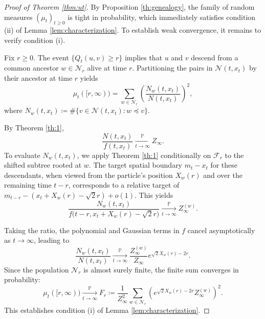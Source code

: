 \documentclass{article}
\begin{document}
\begin{proof}[Proof of Theorem \ref{thm:ut}]
    By Proposition \ref{th:genealogy}, the family of random measures $(\mu_t)_{t \geq 0}$ is tight in probability, which immediately satisfies condition (ii) of Lemma \ref{lem:characterization}. To establish weak convergence, it remains to verify condition (i).

    Fix $r \geq 0$. The event $\{Q_t(u,v) \geq r\}$ implies that $u$ and $v$ descend from a common ancestor $w \in \mathcal{N}_r$ alive at time $r$. Partitioning the pairs in $\mathcal{N}(t,x_t)$ by their ancestor at time $r$ yields
    \begin{equation}
        \mu_t([r, \infty)) = \sum_{w \in \mathcal{N}_r} \left( \frac{N_w(t, x_t)}{N(t, x_t)} \right)^2,
    \end{equation}
    where $N_w(t, x_t) \coloneqq \# \{ v \in \mathcal{N}(t, x_t) : w \preceq v \}$. 

    By Theorem \ref{th:1},
    \begin{equation}
        \frac{N(t, x_t)}{f(t, x_t)} \xrightarrow[t \to \infty]{\mathbb{P}} Z_\infty.
    \end{equation}
    To evaluate $N_w(t, x_t)$, we apply Theorem \ref{th:1} conditionally on $\mathcal{F}_r$ to the shifted subtree rooted at $w$. The target spatial boundary $m_t - x_t$ for these descendants, when viewed from the particle's position $X_w(r)$ and over the remaining time $t-r$, corresponds to a relative target of $m_{t-r} - (x_t + X_w(r) - \sqrt{2}r) + o(1)$. This yields 
    \begin{equation}
        \frac{N_w(t, x_t)}{f\big(t-r, x_t + X_w(r) - \sqrt{2}r\big)} \xrightarrow[t \to \infty]{\mathbb{P}} Z_\infty^{(w)}.
    \end{equation}

    
    Taking the ratio, the polynomial and Gaussian terms in $f$ cancel asymptotically as $t \to \infty$, leading to
    \begin{equation}
        \frac{N_w(t, x_t)}{N(t, x_t)} \xrightarrow[t \to \infty]{\mathbb{P}} \frac{Z_\infty^{(w)}}{Z_\infty} e^{\sqrt{2}X_w(r)-2r}.
    \end{equation}
    Since the population $\mathcal{N}_r$ is almost surely finite, the finite sum converges in probability:
    \begin{equation}
        \mu_t([r, \infty)) \xrightarrow[t \to \infty]{\mathbb{P}} F_r \coloneqq \frac{1}{Z_\infty^2} \sum_{w \in \mathcal{N}_r} \left( e^{\sqrt{2}X_w(r)-2r} Z_\infty^{(w)} \right)^2.
    \end{equation}
    This establishes condition (i) of Lemma \ref{lem:characterization}. 
    

\end{proof}
\end{document}
